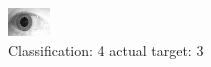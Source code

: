 \begin{figure}[h!]
\begin{center}
\includegraphics[width=0.60\columnwidth]{figures/ID1908_class_4_target_3.png}
\end{center}
\caption{ Classification: 4 actual target: 3}
\label{fig:ID1908_class_4_target_3}
\end{figure}
